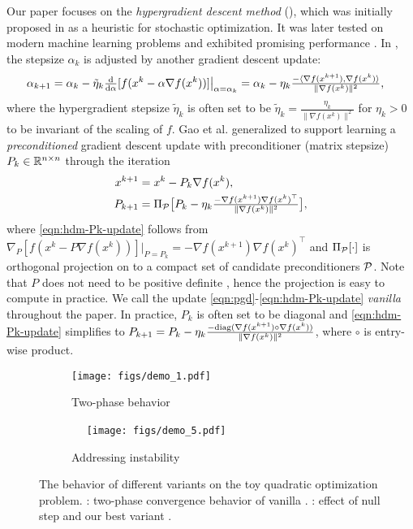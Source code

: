 Our paper focuses on the \emph{hypergradient descent method} (\hdm), which was initially proposed in \cite{almeida1999parameter} as a heuristic for stochastic optimization. It was later tested on modern machine learning problems and exhibited promising performance \cite{gunes2018online}. In {\hdm}, the stepsize $\alpha_k$ is adjusted by another gradient descent update:
\begin{align*}
\alpha_{k+1} &= \alpha_k - \tilde{\eta}_k \tfrac{\mathrm{d}}{\mathrm{d} \alpha}[f(x^k - \alpha \nabla f(x^k))]\big|_{\alpha = \alpha_k} = \alpha_k - \eta_k \tfrac{-\langle \nabla f(x^{k+1}), \nabla f(x^k) \rangle}{\| \nabla f(x^k) \|^2},
\end{align*}
where the hypergradient stepsize $\tilde{\eta}_k$ is often set to be $\tilde{\eta}_k = \tfrac{\eta_k}{\| \nabla f(x^k) \|^2}$ for $\eta_k > 0$ to be invariant of the scaling of $f$.
Gao et al. \cite{gao2024gradient} generalized {\hdm}
to support learning a \emph{preconditioned} gradient descent update with 
preconditioner (matrix stepsize) $P_k \in \mathbb{R}^{n\times n}$
through the iteration
\begin{align}
    x^{k+1} ={} & x^k - P_k \nabla f(x^k), \label{eqn:pgd} \\
    P_{k+1} ={} & \Pi_{\mathcal{P}} \big[P_k - \eta_k \tfrac{-\nabla f(x^{k+1}) \nabla f(x^k)^{\top}}{\| \nabla f(x^k) \|^2}\big], \label{eqn:hdm-Pk-update}
\end{align}
where \eqref{eqn:hdm-Pk-update} follows from $\nabla_P[ f(x^k - P \nabla f(x^k))] \big|_{P = P_k} = - \nabla f(x^{k+1}) \nabla f(x^k)^{\top}$ and $\Pi_{\mathcal{P}}[\cdot]$ is orthogonal projection on to a compact set of candidate preconditioners $\mathcal{P}$. Note that $P$ does not need to be positive definite \cite{gao2024gradient}, hence the projection is easy to compute in practice. We call the update \eqref{eqn:pgd}-\eqref{eqn:hdm-Pk-update} \emph{vanilla} {\hdm} throughout the paper. In practice, $P_k$ is often set to be diagonal and \eqref{eqn:hdm-Pk-update} simplifies to $P_{k+1} = P_k - \eta_k \tfrac{-\mathrm{diag}(\nabla f(x^{k+1}) \circ \nabla f(x^k))}{\| \nabla f(x^k) \|^2}$, where $\circ$ is entry-wise product.\\

\begin{figure}[t]
  \centering
  \begin{subfigure}{0.35\textwidth}
\texttt{[image: figs/demo\_1.pdf]}
    \caption{Two-phase behavior}
    \label{fig:demo:a}
  \end{subfigure}
  \begin{subfigure}{0.35\textwidth}~~
\texttt{[image: figs/demo\_5.pdf]}
    \caption{Addressing instability}
    \label{fig:demo:b}
  \end{subfigure}
\caption{The behavior of different {\hdm} variants on the toy quadratic optimization problem. : two-phase convergence behavior of vanilla {\hdm}. : effect of null step and our best variant {\hdmbest}. \label{fig-demos}}
  \label{fig:demo:instability}
\end{figure}


